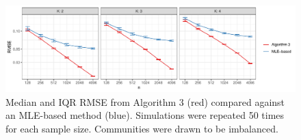 \documentclass[12pt]{article}
\begin{document}
\begin{figure}[H]

{\centering \includegraphics{summary_files/figure-latex/lambda_est_k_imba-1} 

}

\caption{Median and IQR RMSE from Algorithm 3 (red) compared against an MLE-based method (blue). Simulations were repeated 50 times for each sample size. Communities were drawn to be imbalanced.}\label{fig:lambda_est_k_imba}
\end{figure}

\end{document}
